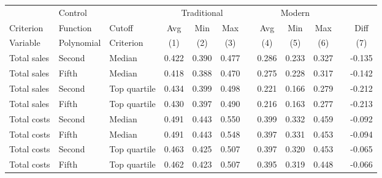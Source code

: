 \begin{tabular}{lllccccccccc}\hline
           & Control    &           & \multicolumn{3}{c}{Traditional} && \multicolumn{3}{c}{Modern} && \\ \cline{4-6} \cline{8-10}
 Criterion & Function   & Cutoff    & Avg & Min & Max && Avg & Min & Max && Diff         \\
 Variable  & Polynomial & Criterion & (1) & (2) & (3) && (4) & (5) & (6) && (7)                  \\ \hline
Total sales&Second&Median&0.422&0.390&0.477&&0.286&0.233&0.327&&-0.135\\
Total sales&Fifth&Median&0.418&0.388&0.470&&0.275&0.228&0.317&&-0.142\\
Total sales&Second&Top quartile&0.434&0.399&0.498&&0.221&0.166&0.279&&-0.212\\
Total sales&Fifth&Top quartile&0.430&0.397&0.490&&0.216&0.163&0.277&&-0.213\\
Total costs&Second&Median&0.491&0.443&0.550&&0.399&0.332&0.459&&-0.092\\
Total costs&Fifth&Median&0.491&0.443&0.548&&0.397&0.331&0.453&&-0.094\\
Total costs&Second&Top quartile&0.463&0.425&0.507&&0.397&0.320&0.453&&-0.065\\
Total costs&Fifth&Top quartile&0.462&0.423&0.507&&0.395&0.319&0.448&&-0.066\\
\hline
\end{tabular}
